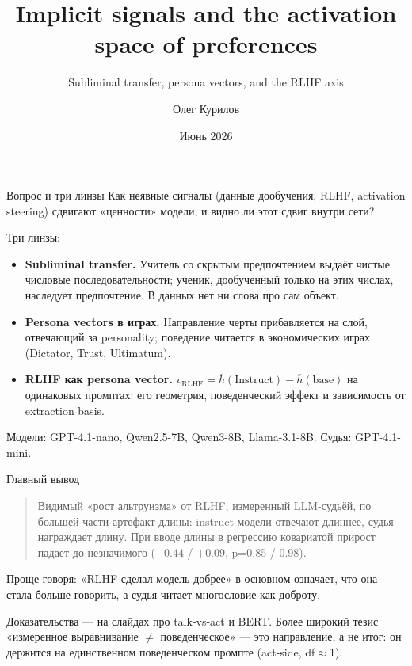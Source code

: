 \documentclass[aspectratio=169,11pt]{beamer}
\title[Implicit signals \& the RLHF axis]{Implicit signals and the activation space of preferences}
\subtitle{Subliminal transfer, persona vectors, and the RLHF axis}
\author{Олег Курилов}
\date{Июнь 2026}
\begin{document}
\begin{frame}\titlepage\end{frame}

\begin{frame}{Вопрос и три линзы}
Как неявные сигналы (данные дообучения, RLHF, activation steering) сдвигают «ценности» модели, и видно ли этот сдвиг внутри сети?

\vspace{0.6em}
Три линзы:
\begin{itemize}
  \item \textbf{Subliminal transfer.} Учитель со скрытым предпочтением выдаёт чистые числовые последовательности; ученик, дообученный только на этих числах, наследует предпочтение. В данных нет ни слова про сам объект.
  \item \textbf{Persona vectors в играх.} Направление черты прибавляется на слой, отвечающий за personality; поведение читается в экономических играх (Dictator, Trust, Ultimatum).
  \item \textbf{RLHF как persona vector.} $v_\text{RLHF}=\overline{h}(\text{Instruct})-\overline{h}(\text{base})$ на одинаковых промптах: его геометрия, поведенческий эффект и зависимость от extraction basis.
\end{itemize}
\vfill
{\footnotesize Модели: GPT-4.1-nano, Qwen2.5-7B, Qwen3-8B, Llama-3.1-8B. Судья: GPT-4.1-mini.}
\end{frame}

\begin{frame}{Главный вывод}
\begin{quote}
Видимый «рост альтруизма» от RLHF, измеренный LLM-судьёй, по большей части артефакт длины: instruct-модели отвечают длиннее, судья награждает длину. При вводе длины в регрессию ковариатой прирост падает до незначимого ($-0.44$ / $+0.09$, p=0.85 / 0.98).
\end{quote}
\vspace{0.4em}
Проще говоря: «RLHF сделал модель добрее» в основном означает, что она стала больше говорить, а судья читает многословие как доброту.
\vspace{0.5em}

{\footnotesize Доказательства — на слайдах про talk-vs-act и BERT. Более широкий тезис «измеренное выравнивание $\neq$ поведенческое» — это направление, а не итог: он держится на единственном поведенческом промпте (act-side, df$\approx$1).}
\end{frame}
\end{document}
